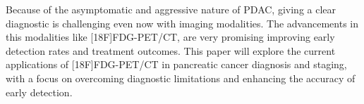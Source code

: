 Because of the asymptomatic and aggressive nature of PDAC, giving a clear diagnostic is challenging even now with imaging modalities. The advancements in this modalities like [18F]FDG-PET/CT, are very promising improving early detection rates and treatment outcomes. This paper will explore the current applications of [18F]FDG-PET/CT in pancreatic cancer diagnosis and staging, with a focus on overcoming diagnostic limitations and enhancing the accuracy of early detection.
